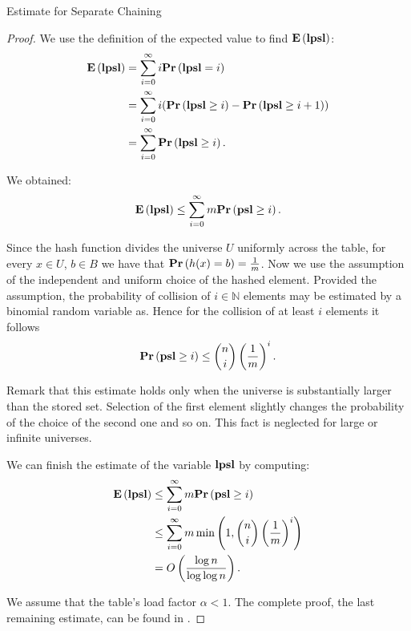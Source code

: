\begin{section}{Estimate for Separate Chaining}
\begin{proof}
We use the definition of the expected value to find $\mathbf{E}\left(\mathbf{lpsl}\right)$:
\begin{displaymath}
\begin{split}
\mathbf{E}\left(\mathbf{lpsl}\right)
	& = \displaystyle \sum_{i=0}^{\infty} i \mathbf{Pr}\left(\mathbf{lpsl} = i\right) \\
	& = \displaystyle \sum_{i = 0}^{\infty} i (\mathbf{Pr}\left(\mathbf{lpsl} \geq i\right) - \mathbf{Pr}\left(\mathbf{lpsl} \geq i + 1\right)) \\ 
	& = \displaystyle \sum_{i = 0}^{\infty} \mathbf{Pr}\left(\mathbf{lpsl} \geq i\right) \text{.}
\end{split}
\end{displaymath}

We obtained:
\begin{displaymath}
\mathbf{E}\left(\mathbf{lpsl}\right) \leq \displaystyle \sum_{i = 0}^{\infty} m \mathbf{Pr}\left(\mathbf{psl} \geq i\right) \text{.}
\end{displaymath}

Since the hash function divides the universe $U$ uniformly across the table, for every $x \in U$, $b \in B$ we have that $\mathbf{Pr}\left(h(x) = b\right) = \frac{1}{m}$. Now we use the assumption of the independent and uniform choice of the hashed element. Provided the assumption, the probability of collision of $i \in \mathbb{N}$ elements may be estimated by a binomial random variable as. Hence for the collision of at least $i$ elements it follows
\begin{displaymath}
\mathbf{Pr}\left(\mathbf{psl} \geq i\right) \leq \dbinom{n}{i}\left(\frac{1}{m}\right)^i \text{.}
\end{displaymath}

Remark that this estimate holds only when the universe is substantially larger than the stored set. Selection of the first element slightly changes the probability of the choice of the second one and so on. This fact is neglected for large or infinite universes.

We can finish the estimate of the variable $\mathbf{lpsl}$ by computing:
\begin{displaymath}
\begin{split}
\mathbf{E}\left(\mathbf{lpsl}\right)	& \leq \displaystyle \sum_{i = 0}^{\infty} m \mathbf{Pr}\left(\mathbf{psl} \geq i\right) \\
		& \leq \displaystyle \sum_{i = 0}^{\infty} m \min\left(1, \dbinom{n}{i}\left(\frac{1}{m}\right)^i\right) \\
		& = O\left(\frac{\log n}{\log \log n}\right) \text{.}
\end{split}
\end{displaymath}

We assume that the table's load factor $\alpha < 1$. The complete proof, the last remaining estimate, can be found in \cite{DBLP:books/sp/Mehlhorn84}.
\end{proof}
\end{section}

